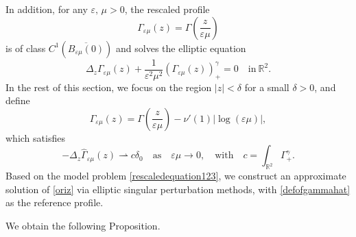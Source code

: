 \documentclass[11pt,reqno,a4paper]{amsart}
\numberwithin{equation}{section}
\newcommand{\R}{\mathbb{R}}
\newcommand{\ve}{\varepsilon}
\begin{document}
In addition, for any $\ve,\,\mu >0$, the rescaled profile 
\begin{equation}\label{erescgamma}
\Gamma_{\ve\mu}(z)=\Gamma\left(\frac{z}{\ve\mu}\right)
\end{equation}
is of class $C^1(\overline{B_{\ve\mu}(0)})$ and solves the elliptic equation
\begin{equation}\label{rescaledequation123}
    \Delta_z\Gamma_{\ve\mu}(z)+\frac{1}{\ve^{2}\mu^2}\left(\Gamma_{\ve\mu}(z)\right)_+^\gamma=0
\quad  \mbox{in}\ \mathbb{R}^2.
\end{equation}
In the rest of this section, we focus on the region $|z|<\delta$ for a small $\delta>0$, and define
\begin{equation}\label{defofgammahat}
\widehat{\Gamma}_{\ve\mu}(z)=\Gamma\left(\frac{z}{\ve\mu}\right)-\nu'(1)|\log(\ve\mu)|,
\end{equation}
which satisfies \[-\Delta_z\widehat{\Gamma}_{\ve\mu}(z) \rightharpoonup c\delta_0  \quad  \mbox{as} \quad \ve\mu \to 0, \quad \mbox{with} \quad c=\int_{\R^2} \Gamma^{\gamma}_{+}.\]
Based on the model problem \eqref{rescaledequation123}, we construct an approximate solution of \eqref{oriz} via elliptic singular perturbation methods, with \eqref{defofgammahat} as the reference profile.

We obtain the following Proposition.
\end{document}
